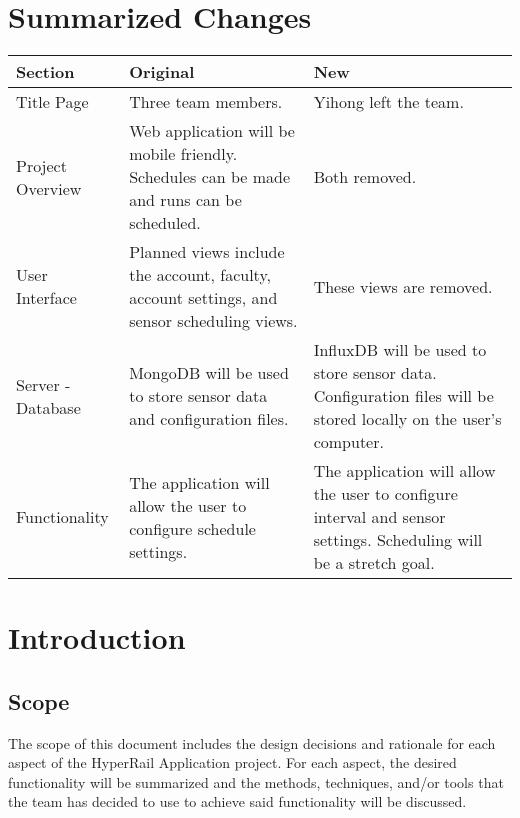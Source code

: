 \documentclass[onecolumn, draftclsnofoot,10pt, compsoc]{IEEEtran}
\begin{document}
\section{Summarized Changes}
\medskip
\begin{centering}

\begin{tabular}{|p{1in} | p{2.5in} | p{2.5in}|}
\hline
\textbf{Section} & \textbf{Original} & \textbf{New}\\\hline
Title Page & Three team members. & Yihong left the team. \\\hline

Project Overview & Web application will be mobile friendly. Schedules can be made and runs can be scheduled. & Both removed. \\\hline

User Interface & Planned views include the account, faculty, account settings, and sensor scheduling views. & These views are removed. \\\hline

Server - Database & MongoDB will be used to store sensor data and configuration files. & InfluxDB will be used to store sensor data. Configuration files will be stored locally on the user's computer. \\\hline

Functionality & The application will allow the user to configure schedule settings. & The application will allow the user to configure interval and sensor settings. Scheduling will be a stretch goal. \\\hline

\end{tabular}

\end{centering}

\pagebreak

\section{Introduction}
\subsection{Scope}
The scope of this document includes the design decisions and rationale for each aspect of the HyperRail Application project. For each aspect, the desired functionality will be summarized and the methods, techniques, and/or tools that the team has decided to use to achieve said functionality will be discussed.
\end{document}
